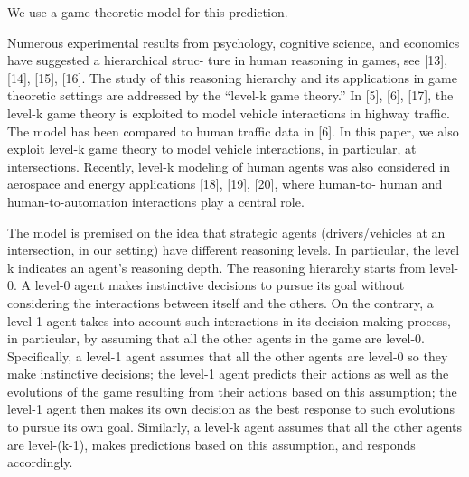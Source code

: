 \documentclass[10pt,journal]{IEEEtran}
\begin{document}
	\noindent
	
	
	We use a game theoretic model for this prediction.
	
	Numerous experimental results from psychology, cognitive science, and economics have suggested a hierarchical struc- ture in human reasoning in games, see [13], [14], [15], [16]. The study of this reasoning hierarchy and its applications in game theoretic settings are addressed by the “level-k game theory.” In [5], [6], [17], the level-k game theory is exploited to model vehicle interactions in highway traffic. The model has been compared to human traffic data in [6]. In this paper, we also exploit level-k game theory to model vehicle interactions, in particular, at intersections. Recently, level-k modeling of human agents was also considered in aerospace and energy applications [18], [19], [20], where human-to- human and human-to-automation interactions play a central role.
	
	
	The model is premised on the idea that strategic agents (drivers/vehicles at an intersection, in our setting) have different reasoning levels. In particular, the level k indicates an agent’s reasoning depth. The reasoning hierarchy starts from level-0. A level-0 agent makes instinctive decisions to pursue its goal without considering the interactions between itself and the others. On the contrary, a level-1 agent takes into account such interactions in its decision making process, in particular, by assuming that all the other agents in the game are level-0. Specifically, a level-1 agent assumes that all the other agents are level-0 so they make instinctive decisions; the level-1 agent predicts their actions as well as the evolutions of the game resulting from their actions based on this assumption; the level-1 agent then makes its own decision as the best response to such evolutions to pursue its own goal. Similarly, a level-k agent assumes that all the other agents are level-(k-1), makes predictions based on this assumption, and responds accordingly.
	
	
\end{document}
